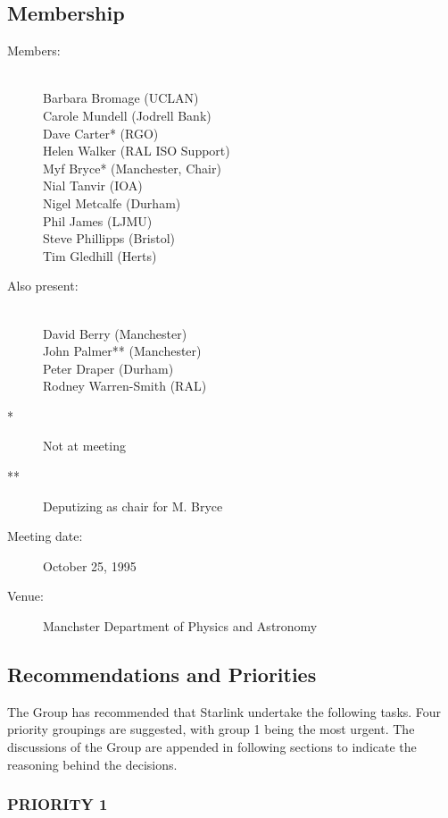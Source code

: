 \subsection{Membership}

\begin{description}
\item[Members:]\mbox{}\\
Barbara Bromage (UCLAN)\\
Carole Mundell (Jodrell Bank)\\
Dave Carter* (RGO)\\
Helen Walker (RAL ISO Support)\\
Myf Bryce* (Manchester, Chair)\\
Nial Tanvir (IOA)\\
Nigel Metcalfe (Durham)\\
Phil James (LJMU)\\
Steve Phillipps (Bristol)\\
Tim Gledhill (Herts)

\item[Also present:]\mbox{}\\
David Berry (Manchester)\\
John Palmer** (Manchester)\\
Peter Draper (Durham)\\
Rodney Warren-Smith (RAL)

\item[*] Not at meeting 
\item[**] Deputizing as chair for M. Bryce

\item[Meeting date:]October 25, 1995

\item[Venue:]Manchster Department of Physics and Astronomy
\end{description}

\subsection{Recommendations and Priorities}

The Group has recommended that Starlink undertake the following tasks.
Four priority groupings are suggested, with group 1 being the most
urgent.  The discussions of the Group are appended in following
sections to indicate the reasoning behind the decisions.

\subsubsection{\label{ipSSG:astrom}PRIORITY 1}

